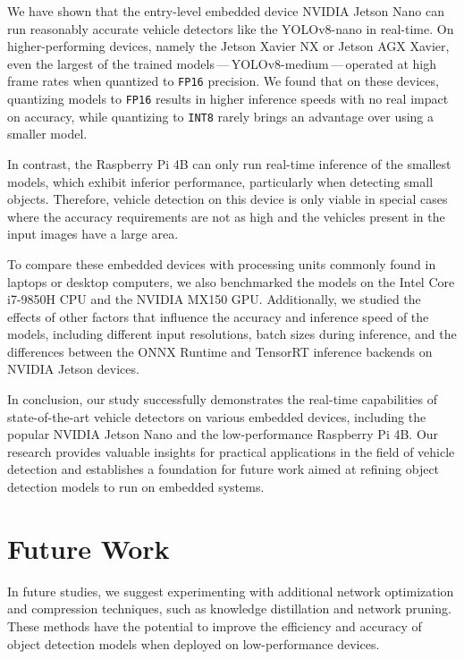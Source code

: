 We have shown that the entry-level embedded device NVIDIA Jetson Nano can run
reasonably accurate vehicle detectors like the YOLOv8-nano in real-time. On
higher-performing devices, namely the Jetson Xavier NX or Jetson AGX Xavier,
even the largest of the trained models\,---\,YOLOv8-medium\,---\,operated at high
frame rates when quantized to \texttt{FP16} precision. We found that on these
devices, quantizing models to \texttt{FP16} results in higher inference speeds
with no real impact on accuracy, while quantizing to \texttt{INT8} rarely brings
an advantage over using a smaller model.

In contrast, the Raspberry Pi 4B can only run real-time inference of the
smallest models, which exhibit inferior performance, particularly when detecting
small objects. Therefore, vehicle detection on this device is only viable in
special cases where the accuracy requirements are not as high and the vehicles
present in the input images have a large area.

To compare these embedded devices with processing units commonly found in
laptops or desktop computers, we also benchmarked the models on the Intel Core
i7-9850H CPU and the NVIDIA MX150 GPU. Additionally, we studied the effects of
other factors that influence the accuracy and inference speed of the models,
including different input resolutions, batch sizes during inference, and the
differences between the ONNX Runtime and TensorRT inference backends on NVIDIA
Jetson devices.

In conclusion, our study successfully demonstrates the real-time capabilities of
state-of-the-art vehicle detectors on various embedded devices, including the
popular NVIDIA Jetson Nano and the low-performance Raspberry Pi 4B. Our research
provides valuable insights for practical applications in the field of vehicle
detection and establishes a foundation for future work aimed at refining object
detection models to run on embedded systems.




\chapter{Future Work}
\label{FutureWork}

In future studies, we suggest experimenting with additional network optimization
and compression techniques, such as knowledge distillation and network pruning.
These methods have the potential to improve the efficiency and accuracy of
object detection models when deployed on low-performance devices.

